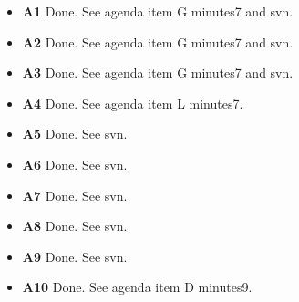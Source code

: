 \documentclass[11pt,journal,draftclsnofoot,onecolumn,twoside,letterpaper]{IEEEtran}
\theoremstyle{definition} \newtheorem{definition}[]{Definition}
\theoremstyle{theorem} \newtheorem{theorem}[]{Theorem}
\begin{document}
\begin{itemize}
 \item {\bf A1} Done. See agenda item G minutes7 and svn. 
 \item {\bf A2} Done. See agenda item G minutes7 and svn. 
 \item {\bf A3} Done. See agenda item G minutes7 and svn.
 \item {\bf A4} Done. See agenda item L minutes7. 
 \item {\bf A5} Done. See svn.
 \item {\bf A6} Done. See svn. 
 \item {\bf A7} Done. See svn. 
 \item {\bf A8} Done. See svn.
 \item {\bf A9} Done. See svn.
 \item {\bf A10} Done. See agenda item D minutes9.
\end{itemize}
\end{document}
